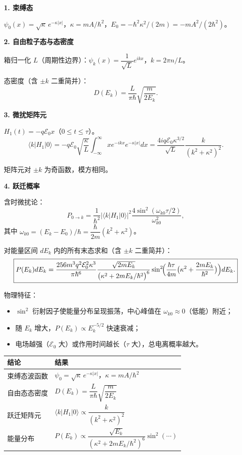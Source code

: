 \begin{derivationbox}[标准解题过程]
\textbf{1. 束缚态}

$\psi_0(x)=\sqrt{\kappa}\,e^{-\kappa|x|}$，$\kappa=mA/\hbar^2$，$E_0=-\hbar^2\kappa^2/(2m)=-mA^2/(2\hbar^2)$。

\textbf{2. 自由粒子态与态密度}

箱归一化 $L$（周期性边界）：$\psi_k(x)=\dfrac{1}{\sqrt{L}}e^{ikx}$，$k=2\pi n/L$。

态密度（含 $\pm k$ 二重简并）：
\[
D(E_k)=\frac{L}{\pi\hbar}\sqrt{\frac{m}{2E_k}}.
\]

\textbf{3. 微扰矩阵元}

$H_1(t)=-q\mathcal{E}_0x$（$0\le t\le\tau$）。
\[
\langle k|H_1|0\rangle=-q\mathcal{E}_0\sqrt{\frac{\kappa}{L}}\int_{-\infty}^{\infty}xe^{-ikx}e^{-\kappa|x|}dx=\frac{4iq\mathcal{E}_0\kappa^{3/2}}{\sqrt{L}}\frac{k}{(k^2+\kappa^2)^2}.
\]

矩阵元对 $\pm k$ 为奇函数，模方相同。

\textbf{4. 跃迁概率}

含时微扰论：
\[
P_{0\to k}=\frac{1}{\hbar^2}|\langle k|H_1|0\rangle|^2\frac{4\sin^2(\omega_{k0}\tau/2)}{\omega_{k0}^2},
\]
其中 $\omega_{k0}=(E_k-E_0)/\hbar=\dfrac{\hbar}{2m}(k^2+\kappa^2)$。

对能量区间 $dE_k$ 内的所有末态求和（含 $\pm k$ 二重简并）：
\begin{equation}
\boxed{P(E_k)dE_k=\frac{256m^3q^2\mathcal{E}_0^2\kappa^3}{\pi\hbar^6}\frac{\sqrt{2mE_k}}{\bigl(\kappa^2+2mE_k/\hbar^2\bigr)^6}\sin^2\!\Bigl(\frac{\hbar\tau}{4m}\bigl(\kappa^2+\frac{2mE_k}{\hbar^2}\bigr)\Bigr)dE_k.}
\end{equation}

物理特征：
\begin{itemize}
    \item $\sin^2$ 衍射因子使能量分布呈现振荡，中心峰值在 $\omega_{k0}\approx0$（低能）附近；
    \item 随 $E_k$ 增大，$P(E_k)\propto E_k^{-5/2}$ 快速衰减；
    \item 电场越强（$\mathcal{E}_0$ 大）或作用时间越长（$\tau$ 大），总电离概率越大。
\end{itemize}
\end{derivationbox}

\begin{formulabox}[答案汇总]
\begin{center}
\begin{tabular}{ll}
\toprule
\textbf{结论} & \textbf{结果} \\
\midrule
束缚态波函数 & $\psi_0=\sqrt{\kappa}\,e^{-\kappa|x|}$，$\kappa=mA/\hbar^2$ \\
自由态态密度 & $D(E_k)=\dfrac{L}{\pi\hbar}\sqrt{\dfrac{m}{2E_k}}$ \\
跃迁矩阵元 & $\langle k|H_1|0\rangle\propto\dfrac{k}{(k^2+\kappa^2)^2}$ \\
能量分布 & $P(E_k)\propto\dfrac{\sqrt{E_k}}{(\kappa^2+2mE_k/\hbar^2)^6}\sin^2(\cdots)$ \\
\bottomrule
\end{tabular}
\end{center}
\end{formulabox}

